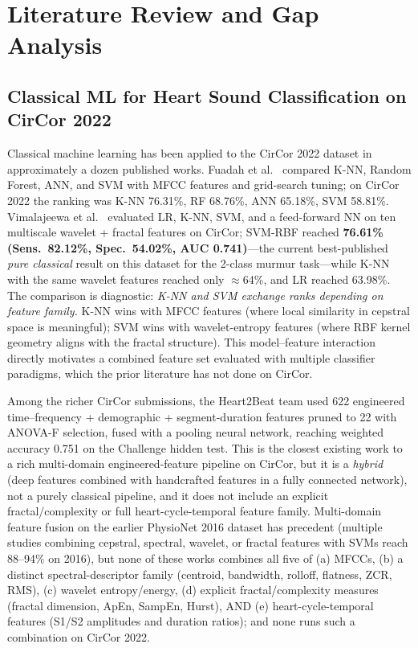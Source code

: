 \documentclass[10pt,twocolumn]{article}
\begin{document}
\section{Literature Review and Gap Analysis}

\subsection{Classical ML for Heart Sound Classification on CirCor 2022}

Classical machine learning has been applied to the CirCor 2022 dataset in approximately a dozen published works. Fuadah et al.\ \citep{fuadah2023} compared K-NN, Random Forest, ANN, and SVM with MFCC features and grid-search tuning; on CirCor 2022 the ranking was K-NN 76.31\%, RF 68.76\%, ANN 65.18\%, SVM 58.81\%. Vimalajeewa et al.\ \citep{wavelet2025} evaluated LR, K-NN, SVM, and a feed-forward NN on ten multiscale wavelet + fractal features on CirCor; SVM-RBF reached \textbf{76.61\% (Sens.\ 82.12\%, Spec.\ 54.02\%, AUC 0.741)}---the current best-published \textit{pure classical} result on this dataset for the 2-class murmur task---while K-NN with the same wavelet features reached only $\approx$64\%, and LR reached 63.98\%. The comparison is diagnostic: \textit{K-NN and SVM exchange ranks depending on feature family.} K-NN wins with MFCC features (where local similarity in cepstral space is meaningful); SVM wins with wavelet-entropy features (where RBF kernel geometry aligns with the fractal structure). This model--feature interaction directly motivates a combined feature set evaluated with multiple classifier paradigms, which the prior literature has not done on CirCor.

Among the richer CirCor submissions, the Heart2Beat team \citep{rohr2024heart2beat} used 622 engineered time--frequency + demographic + segment-duration features pruned to 22 with ANOVA-F selection, fused with a pooling neural network, reaching weighted accuracy 0.751 on the Challenge hidden test. This is the closest existing work to a rich multi-domain engineered-feature pipeline on CirCor, but it is a \textit{hybrid} (deep features combined with handcrafted features in a fully connected network), not a purely classical pipeline, and it does not include an explicit fractal/complexity or full heart-cycle-temporal feature family. Multi-domain feature fusion on the earlier PhysioNet 2016 dataset has precedent (multiple studies combining cepstral, spectral, wavelet, or fractal features with SVMs reach 88--94\% on 2016), but none of these works combines all five of (a) MFCCs, (b) a distinct spectral-descriptor family (centroid, bandwidth, rolloff, flatness, ZCR, RMS), (c) wavelet entropy/energy, (d) explicit fractal/complexity measures (fractal dimension, ApEn, SampEn, Hurst), AND (e) heart-cycle-temporal features (S1/S2 amplitudes and duration ratios); and none runs such a combination on CirCor 2022.
\end{document}
